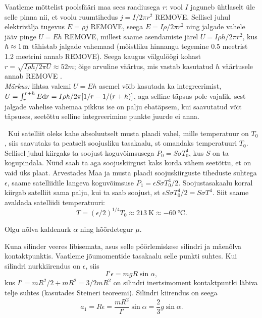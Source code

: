 \documentclass[10pt]{article}
\newcommand{\p}[1]{REMOVE}
\begin{document}
\osa Vaatleme mõttelist poolsfääri maa sees raadiusega $r$: vool $I$ jaguneb ühtlaselt üle selle pinna nii, et voolu ruumtihedus $j=I/2\pi r^2$ \p2. Sellisel juhul elektrivälja tugevus $E=\rho j$ \p1, seega $E=I\rho/2\pi r^2$ ning jalgade vahele jääv pinge $U=Eh$ \p1, millest saame asendamiste järel $U=I\rho h/2\pi r^2$, kus $h\approx\SI 1m$ tähistab jalgade vahemaad (mõistliku hinnangu tegemine \num{0.5} meetrist \num{1.2} meetrini annab \p1). Seega kaugus välgulöögi kohast $r=\sqrt{I\rho h/2\pi U}\approx\SI{52}m$; õige arvuline väärtus, mis vastab kasutatud $h$ väärtusele annab \p1 .
\\\emph{Märkus:} lihtsa valemi $U=Eh$ asemel võib kasutada ka integreerimist, $U=\int_r^{r+h} E\textrm dr=I\rho h/2\pi[1/r-1/(r+h)]$, aga selline täpsus pole vajalik, sest jalgade vahelise vahemaa pikkus ise on palju ebatäpsem, kui saavutatud võit täpsuses, seetõttu selline integreerimine punkte juurde ei anna.
\probend
\bigskip


\solu
\
Kui satelliit oleks kahe absoluutselt musta plaadi vahel, mille temperatuur on $T_0$, siis saavutaks ta peatselt soojusliku tasakaalu, st omandaks temperatuuri $T_0$. Sellisel juhul kiirgaks ta soojust koguvõimsusega $P_0=S \sigma T^4_0$, kus $S$ on ta kogupindala. Nüüd saab ta aga soojuskiirgust kaks korda vähem seetõttu, et on vaid üks plaat. Arvestades Maa ja musta plaadi soojuskiirguste tiheduste suhtega $\epsilon$, saame satelliidile langeva koguvõimsuse $P_1=\epsilon S \sigma T^4_0/2$. Soojustasakaalu korral kiirgab satelliit sama palju, kui ta saab soojust, st $\epsilon S \sigma T^4_0/2=S \sigma T^4$. Siit saame avaldada satelliidi temperatuuri:
$$
T=(\epsilon/2)^{1/4}T_0 \approx \SI{213}{\kelvin} \approx \SI{-60}{\celsius}. 
$$
\probend
\bigskip


\solu
Olgu nõlva kaldenurk $\alpha$ ning hõõrdetegur $\mu$.

Kuna silinder veeres libisemata, asus selle pöörlemiskese silindri ja mäenõlva kontaktpunktis. Vaatleme jõumomentide tasakaalu selle punkti suhtes. Kui silindri nurkkiirendus on $\epsilon$, siis
\[
I'\epsilon = mgR\sin\alpha,
\]
kus $I' = mR^2/2 + mR^2 = 3/2 mR^2$ on silindri inertsimoment kontaktpuntki läbiva telje suhtes (kasutades Steineri teoreemi). Silindri kiirendus on seega
\[
a_1 = R\epsilon = \frac{mR^2}{I'} \sin\alpha = \frac{2}{3}g\sin\alpha.
\]
\end{document}
